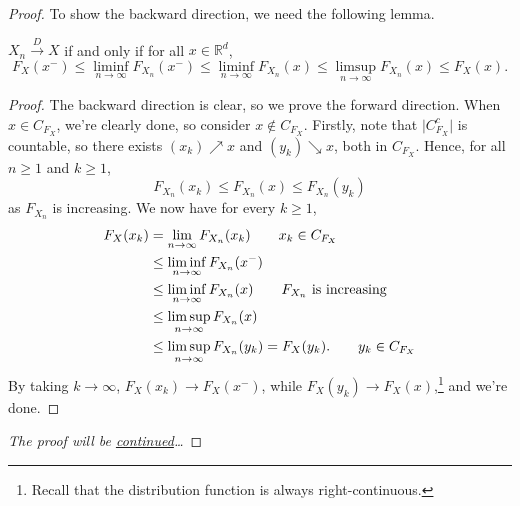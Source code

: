 \begin{proof}
	To show the backward direction, we need the following lemma.
	\begin{lemma}\label{lma:distribution-function-limit-inequality}
		\(X_n \overset{D}{\to } X\) if and only if for all \(x \in \mathbb{R} ^d\),
		\[
			F_X(x^-)
			\leq \liminf_{n \to \infty} F_{X_n} (x^-)
			\leq \liminf_{n \to \infty} F_{X_n} (x)
			\leq \limsup_{n \to \infty} F_{X_n} (x)
			\leq F_X(x).
		\]
	\end{lemma}
	\begin{proof}
		The backward direction is clear, so we prove the forward direction. When \(x\in C_{F_X}\), we're clearly done, so consider \(x \notin C_{F_X}\). Firstly, note that \(\vert C_{F_X}^{c} \vert \) is countable, so there exists \((x_k) \nearrow x\) and \((y_k) \searrow x\), both in \(C_{F_X}\). Hence, for all \(n \geq 1\) and \(k \geq 1\),
		\[
			F_{X_n}(x_k)
			\leq F_{X_n}(x)
			\leq F_{X_n}(y_k)
		\]
		as \(F_{X_n}\) is increasing. We now have for every \(k \geq 1\),
		\begin{align*}
			F_X(x_k)
			 & = \lim_{n \to \infty} F_{X_n}(x_k) \tag*{\(x_k \in C_{F_X}\)}           \\
			 & \leq \liminf_{n \to \infty} F_{X_n}(x^-)                                \\
			 & \leq \liminf_{n \to \infty} F_{X_n}(x) \tag*{\(F_{X_n}\) is increasing} \\
			 & \leq \limsup_{n \to \infty} F_{X_n}(x)                                  \\
			 & \leq \limsup_{n \to \infty} F_{X_n}(y_k)
			= F_X(y_k). \tag*{\(y_k \in C_{F_X}\)}
		\end{align*}
		By taking \(k \to \infty \), \(F_X(x_k) \to F_X(x^-)\), while \(F_X(y_k) \to F_X(x)\),\footnote{Recall that the distribution function is always right-continuous.} and we're done.
	\end{proof}
	\emph{The proof will be \hyperref[pf:thm:weak-convergence-is-convergence-in-distribution]{continued}\dots}
\end{proof}